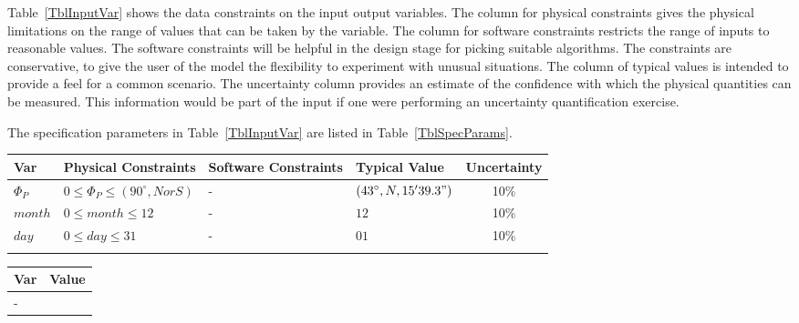 \documentclass[12pt]{article}
\begin{document}
Table~\ref{TblInputVar} shows the data constraints on the input output
variables.  The column for physical constraints gives the physical limitations
on the range of values that can be taken by the variable.  The column for
software constraints restricts the range of inputs to reasonable values.  The
software constraints will be helpful in the design stage for picking suitable
algorithms.  The constraints are conservative, to give the user of the model the
flexibility to experiment with unusual situations.  The column of typical values
is intended to provide a feel for a common scenario.  The uncertainty column
provides an estimate of the confidence with which the physical quantities can be
measured.  This information would be part of the input if one were performing an
uncertainty quantification exercise.

The specification parameters in Table~\ref{TblInputVar} are listed in
Table~\ref{TblSpecParams}.

\begin{table}[!h]
  \caption{Input Variables} \label{TblInputVar}
  \renewcommand{\arraystretch}{1.2}
\noindent \begin{longtable*}{l l l l c} 
  \toprule
  \textbf{Var} & \textbf{Physical Constraints} & \textbf{Software Constraints} &
                             \textbf{Typical Value} & \textbf{Uncertainty}\\
  \midrule 
  $\Phi_P$ & $0 \leq \Phi_P \leq (90^\circ,  N or S)$ & $\text{-}$ & {$(43^\circ, N, 15'39.3")$} & 10\%\\
  $month$ & $0 \leq month \leq 12$ & $\text{-}$ & $12$& 10\%\\
  $day$ & $0 \leq day \leq 31$ & $\text{-}$ & $01$ & 10\%\\
  \\
  \bottomrule
\end{longtable*}
\end{table}

\noindent 

\begin{table}[!h]
\caption{Specification Parameter Values} \label{TblSpecParams}
\renewcommand{\arraystretch}{1.2}
\noindent \begin{longtable*}{l l} 
  \toprule
  \textbf{Var} & \textbf{Value} \\
  \midrule 
  $\text{-}$ & \text{-}\\
  \bottomrule
\end{longtable*}
\end{table}
\end{document}
